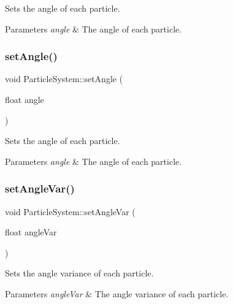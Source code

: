 Sets the angle of each particle.


\begin{DoxyParams}{Parameters}
{\em angle} & The angle of each particle. \\
\hline
\end{DoxyParams}
\mbox{\label{classParticleSystem_aa935e74f8382d39d6c749265711b3c00}} 
\subsubsection{\texorpdfstring{set\+Angle()}{setAngle()}\hspace{0.1cm}{\footnotesize\ttfamily [2/2]}}
{\footnotesize\ttfamily void Particle\+System\+::set\+Angle (\begin{DoxyParamCaption}\item[{float}]{angle }\end{DoxyParamCaption})\hspace{0.3cm}{\ttfamily [inline]}}

Sets the angle of each particle.


\begin{DoxyParams}{Parameters}
{\em angle} & The angle of each particle. \\
\hline
\end{DoxyParams}
\mbox{\label{classParticleSystem_af523f33ff9f61ff84e0f807e90aca456}} 
\subsubsection{\texorpdfstring{set\+Angle\+Var()}{setAngleVar()}\hspace{0.1cm}{\footnotesize\ttfamily [1/2]}}
{\footnotesize\ttfamily void Particle\+System\+::set\+Angle\+Var (\begin{DoxyParamCaption}\item[{float}]{angle\+Var }\end{DoxyParamCaption})\hspace{0.3cm}{\ttfamily [inline]}}

Sets the angle variance of each particle.


\begin{DoxyParams}{Parameters}
{\em angle\+Var} & The angle variance of each particle. \\
\hline
\end{DoxyParams}
\mbox{\label{classParticleSystem_af523f33ff9f61ff84e0f807e90aca456}} 
